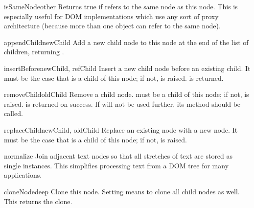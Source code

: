 \begin{methoddesc}[Node]{isSameNode}{other}
Returns true if  refers to the same node as this node.
This is especially useful for DOM implementations which use any sort
of proxy architecture (because more than one object can refer to the
same node).

\end{methoddesc}

\begin{methoddesc}[Node]{appendChild}{newChild}
Add a new child node to this node at the end of the list of children,
returning .
\end{methoddesc}

\begin{methoddesc}[Node]{insertBefore}{newChild, refChild}
Insert a new child node before an existing child.  It must be the case
that  is a child of this node; if not,
 is raised.   is returned.
\end{methoddesc}

\begin{methoddesc}[Node]{removeChild}{oldChild}
Remove a child node.   must be a child of this node; if
not,  is raised.   is returned on
success.  If  will not be used further, its
 method should be called.
\end{methoddesc}

\begin{methoddesc}[Node]{replaceChild}{newChild, oldChild}
Replace an existing node with a new node. It must be the case that 
 is a child of this node; if not,
 is raised.
\end{methoddesc}

\begin{methoddesc}[Node]{normalize}{}
Join adjacent text nodes so that all stretches of text are stored as
single  instances.  This simplifies processing text from a
DOM tree for many applications.
\end{methoddesc}

\begin{methoddesc}[Node]{cloneNode}{deep}
Clone this node.  Setting  means to clone all child nodes as
well.  This returns the clone.
\end{methoddesc}


